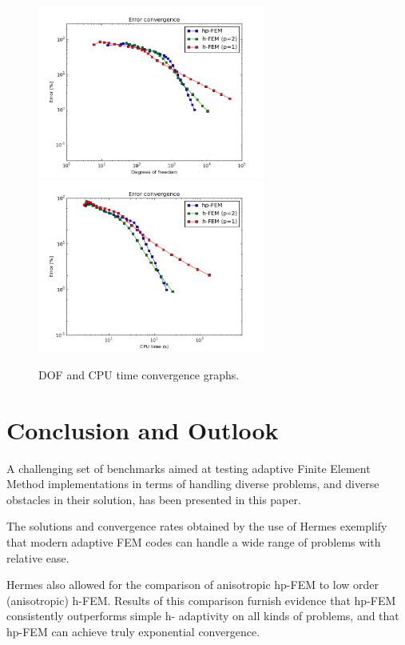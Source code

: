 \documentclass[12pt]{elsarticle}
\begin{document}
\begin{figure}[H]
\centering
\hspace{-50mm}
\includegraphics[width=7.5cm]{nist/nist-12/conv_dof_aniso.png}\ \
\hspace{-10mm}
\includegraphics[width=7.5cm]{nist/nist-12/conv_cpu_aniso.png}
\hspace{-50mm}
\caption{DOF and CPU time convergence graphs.}
\label{fig:nist-12-conv}
\end{figure}
\vspace{-8mm}

\section{Conclusion and Outlook}
\label{sec:conclusion}

A challenging set of benchmarks aimed at testing adaptive Finite Element Method implementations in terms of handling diverse problems, and diverse obstacles in their solution, has been presented in this paper.

The solutions and convergence rates obtained by the use of Hermes exemplify that modern adaptive FEM codes can handle a wide range of problems with relative ease.

Hermes also allowed for the comparison of anisotropic hp-FEM to low order (anisotropic) h-FEM. Results of this comparison furnish evidence that hp-FEM consistently outperforms simple h- adaptivity on all kinds of problems, and that hp-FEM can achieve truly exponential convergence.
\end{document}
